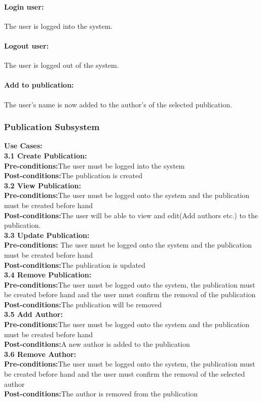 \documentclass{article}
\begin{document}
				\paragraph{Login user:} The user is logged into the system.
				\paragraph{Logout user:} The user is logged out of the system.
				\paragraph{Add to publication:} The user's name is now added to the author's of the selected publication.
			\subsubsection{Publication Subsystem}
				\textbf{Use Cases:}\\
				\indent \textbf{3.1 Create Publication:}\\
					\indent \indent \textbf{Pre-conditions:}The user must be logged into the system\\
					\indent \indent \textbf{Post-conditions:}The publication is created\\
				\indent \textbf{3.2 View Publication:}\\
					\indent \indent \textbf{Pre-conditions:}The user must be logged onto the system and the publication must be created before hand\\
					\indent \indent \textbf{Post-conditions:}The user will be able to view and edit(Add authors etc.) to the publication.\\
				\indent \textbf{3.3 Update Publication:}\\
					\indent \indent \textbf{Pre-conditions:} The user must be logged onto the system and the publication must be created before hand\\
					\indent \indent \textbf{Post-conditions:}The publication is updated\\
				\indent \textbf{3.4 Remove Publication:}\\
					\indent \indent \textbf{Pre-conditions:}The user must be logged onto the system, the publication must be created before hand and the user must confirm the removal of the publication\\
					\indent \indent \textbf{Post-conditions:}The publication will be removed\\
				\indent \textbf{3.5 Add Author:}\\
					\indent \indent \textbf{Pre-conditions:}The user must be logged onto the system and the publication must be created before hand\\
					\indent \indent \textbf{Post-conditions:}A new author is added to the publication\\
				\indent \textbf{3.6 Remove Author:}\\
					\indent \indent \textbf{Pre-conditions:}The user must be logged onto the system, the publication must be created before hand and the user must confirm the removal of the selected author\\
					\indent \indent \textbf{Post-conditions:}The author is removed from the publication\\
\end{document}
